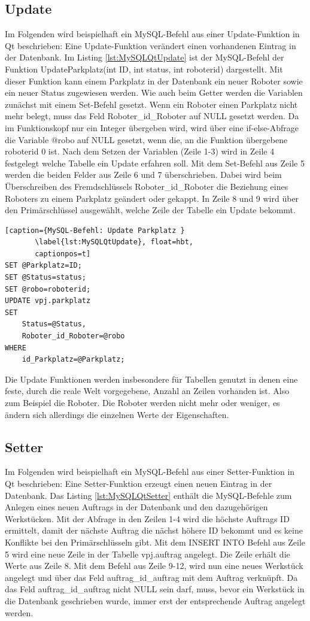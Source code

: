 \subsection{Update}\label{kap:MySQLUpdate}
Im Folgenden wird beispielhaft ein MySQL-Befehl aus einer Update-Funktion in Qt beschrieben: Eine Update-Funktion verändert einen vorhandenen Eintrag in der Datenbank. Im Listing \ref{lst:MySQLQtUpdate} ist der MySQL-Befehl der Funktion UpdateParkplatz(int ID, int status, int roboterid) dargestellt. Mit dieser Funktion kann einem Parkplatz in der Datenbank ein neuer Roboter sowie ein neuer Status zugewiesen werden. Wie auch beim Getter werden die Variablen zunächst mit einem Set-Befehl gesetzt. Wenn ein Roboter einen Parkplatz nicht mehr belegt, muss das Feld Roboter\_id\_Roboter auf NULL gesetzt werden. Da im Funktionskopf nur ein Integer übergeben wird, wird über eine if-else-Abfrage die Variable @robo auf NULL gesetzt, wenn die, an die Funktion übergebene roboterid 0 ist.
Nach dem Setzen der Variablen (Zeile 1-3) wird in Zeile 4 festgelegt welche Tabelle ein Update erfahren soll. Mit dem Set-Befehl aus Zeile 5 werden die beiden Felder aus Zeile 6 und 7 überschrieben. Dabei wird beim Überschreiben des Fremdschlüssels Roboter\_id\_Roboter die Beziehung eines Roboters zu einem Parkplatz geändert oder gekappt. In Zeile 8 und 9 wird über den Primärschlüssel ausgewählt, welche Zeile der Tabelle ein Update bekommt.

\begin{lstlisting}[caption={MySQL-Befehl: Update Parkplatz }
       \label{lst:MySQLQtUpdate}, float=hbt,
       captionpos=t]
SET @Parkplatz=ID;
SET @Status=status;
SET @robo=roboterid;
UPDATE vpj.parkplatz
SET 
    Status=@Status, 
    Roboter_id_Roboter=@robo 
WHERE 
    id_Parkplatz=@Parkplatz;
\end{lstlisting}
Die Update Funktionen werden insbesondere für Tabellen genutzt in denen eine feste, durch die reale Welt vorgegebene, Anzahl an Zeilen vorhanden ist. Also zum Beispiel die Roboter. Die Roboter werden nicht mehr oder weniger, es ändern sich allerdings die einzelnen Werte der Eigenschaften.

\subsection{Setter}\label{kap:MySQLSetter}
Im Folgenden wird beispielhaft ein MySQL-Befehl aus einer Setter-Funktion in Qt beschrieben: Eine Setter-Funktion erzeugt einen neuen Eintrag in der Datenbank. Das Listing \ref{lst:MySQLQtSetter} enthält die MySQL-Befehle zum Anlegen eines neuen Auftrags in der Datenbank und den dazugehörigen Werkstücken. Mit der Abfrage in den Zeilen 1-4 wird die höchste Auftrags ID ermittelt, damit der nächste Auftrag die nächst höhere ID bekommt und es keine Konflikte bei den Primärschlüsseln gibt. Mit dem INSERT INTO Befehl aus Zeile 5 wird eine neue Zeile in der Tabelle vpj.auftrag angelegt. Die Zeile erhält die Werte aus Zeile 8. Mit dem Befehl aus Zeile 9-12, wird nun eine neues Werkstück angelegt und über das Feld auftrag\_id\_auftrag mit dem Auftrag verknüpft. Da das Feld auftrag\_id\_auftrag nicht NULL sein darf, muss, bevor ein Werkstück in die Datenbank geschrieben wurde, immer erst der entsprechende Auftrag angelegt werden. 

